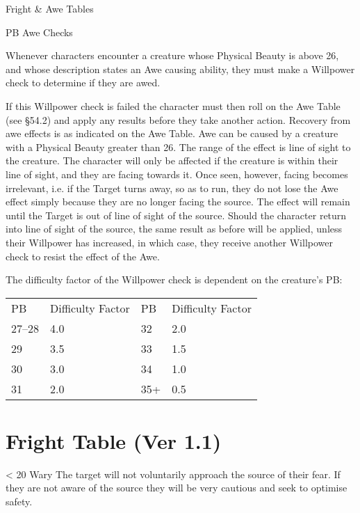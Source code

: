 \begin{Tables}{Fright \& Awe Tables}
\begin{multicols}{3}
PB Awe Checks 

Whenever characters encounter a creature whose Physical Beauty is
above 26, and whose description states an Awe causing ability, they
must make a Willpower check to determine if they are awed.

If this Willpower check is failed the character must then roll on the
Awe Table (see §54.2) and apply any results before they take another
action. Recovery from awe effects is as indicated on the Awe Table.
Awe can be caused by a creature with a Physical Beauty greater than
26.  The range of the effect is line of sight to the creature. The
character will only be affected if the creature is within their line
of sight, and they are facing towards it.  Once seen, however, facing
becomes irrelevant, i.e. if the Target turns away, so as to run, they
do not lose the Awe effect simply because they are no longer facing
the source.  The effect will remain until the Target is out of line of
sight of the source. Should the character return into line of sight of
the source, the same result as before will be applied, unless their
Willpower has increased, in which case, they receive another Willpower
check to resist the effect of the Awe.

The  difficulty  factor  of  the  Willpower  check  is 
dependent on the creature’s PB: 

\begin{tabularx}{\columnwidth}{lXlX} 
PB	& Difficulty Factor	& PB	& Difficulty  Factor \\
27–28	& 4.0			& 32	& 2.0 \\
29	& 3.5			& 33	& 1.5 \\
30	& 3.0			& 34	& 1.0 \\
31	& 2.0			& 35+	& 0.5 \\
\end{tabularx}

\end{multicols}

\section{Fright Table (Ver 1.1)}

\begin{Description}

\item[< 20] Wary The target will not voluntarily approach the source
  of their fear. If they are not aware of the source they will be very
  cautious and seek to optimise safety.


\end{Description}
\end{Tables}
